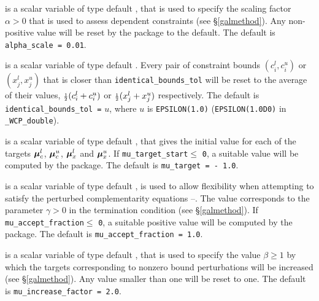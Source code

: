 \documentclass{galahad}
\newcommand{\packagename}{WCP}
\newcommand{\fullpackagename}{\libraryname\_\-\packagename}
\begin{document}
\begin{description}


 is a scalar variable of type default \realdp, that is used to
specify the scaling factor $\alpha > 0$ that is used to assess dependent 
constraints (see \S\ref{galmethod}). Any non-positive value will be
reset by the package to the default. The default is {\tt alpha\_scale = 0.01}.

is a scalar variable of type default \realdp.
Every pair of constraint bounds 
$(c_{i}^{l}, c_{i}^{u})$ or $(x_{j}^{l}, x_{j}^{u})$
that is closer than {\tt identical\_bounds\_tol} 
will be reset to the average of their values,
${\scriptstyle \frac{1}{2}} (c_{i}^{l} + c_{i}^{u})$ or ${\scriptstyle \frac{1}{2}} (x_{j}^{l} + x_{j}^{u})$
respectively.
The default is {\tt identical\_bounds\_tol =} $u$,
where $u$ is {\tt EPSILON(1.0)} ({\tt EPSILON(1.0D0)} in 
{\tt \fullpackagename\_double}).

 is a scalar variable of type default \realdp, 
that gives the initial value for each of the targets
$\bm \mu_c^{l}$, $\bm \mu_c^{u}$, $\bm \mu_x^{l}$ and $\bm \mu_x^{u}$.
If {\tt mu\_target\_start}$\leq$ {\tt 0}, a suitable value will be
computed by the package. The default is {\tt mu\_target = - 1.0}.

 is a scalar variable of type default \realdp, 
is used to allow flexibility when attempting to satisfy the perturbed 
complementarity equations --. The value
corresponds to the parameter $\gamma > 0$ in the termination condition
 (see \S\ref{galmethod}).
If {\tt mu\_accept\_fraction}$\leq$ {\tt 0}, a suitable positive value will be
computed by the package. The default is {\tt mu\_accept\_fraction = 1.0}.

 is a scalar variable of type default \realdp, 
that is used to specify the value $\beta \geq 1$ by which the targets
corresponding to nonzero bound perturbations will be increased
(see \S\ref{galmethod}). Any value smaller than one will be reset to one.
The default is {\tt mu\_increase\_factor = 2.0}.


\end{description}
\end{document}
